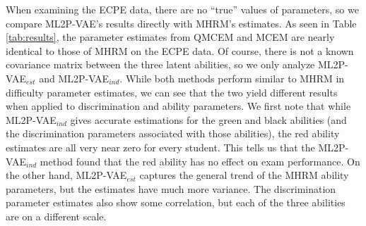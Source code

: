 When examining the ECPE data, there are no ``true'' values of parameters, so we compare ML2P-VAE's results directly with MHRM's estimates. As seen in Table \ref{tab:results}, the parameter estimates from QMCEM and MCEM are nearly identical to those of MHRM on the ECPE data. Of course, there is not a known covariance matrix between the three latent abilities, so we only analyze ML2P-VAE$_{est}$ and ML2P-VAE$_{ind}$. While both methods perform similar to MHRM in difficulty parameter estimates, we can see that the two yield different results when applied to discrimination and ability parameters. We first note that while ML2P-VAE$_{ind}$ gives accurate estimations for the green and black abilities (and the discrimination parameters associated with those abilities), the red ability estimates are all very near zero for every student. This tells us that the ML2P-VAE$_{ind}$ method found that the red ability has no effect on exam performance. On the other hand, ML2P-VAE$_{est}$ captures the general trend of the MHRM ability  parameters, but the estimates have much more variance. The discrimination parameter estimates also show some correlation, but each of the three abilities are on a different scale.

